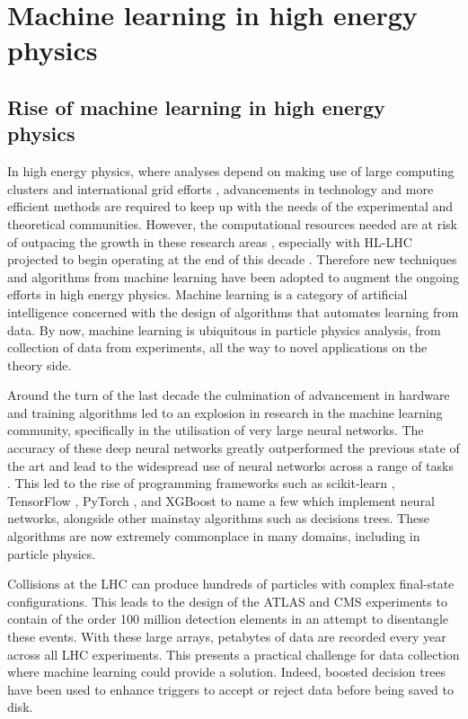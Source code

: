 \documentclass[main.tex]{subfiles}
\begin{document}
\chapter{Machine learning in high energy physics}
\label{chapter:ml}
\section{Rise of machine learning in high energy physics}
    In high energy physics, where analyses
    depend on making use of large computing clusters
    and international grid efforts \cite{WLCG}, advancements
    in technology and more efficient methods are
    required to keep up with the needs of the
    experimental and theoretical communities.
    However, the computational resources needed
    are at risk of outpacing the growth in these research
    areas \cite{Bothmann:2022thx}, especially with
    HL-LHC projected to begin operating at the end
    of this decade \cite{ZurbanoFernandez:2020cco}.
    Therefore new techniques and
    algorithms from machine learning 
    have been adopted to augment the ongoing efforts
    in high energy physics. Machine
    learning is a category of artificial intelligence
    concerned with the design of algorithms that
    automates learning from data.
    By now, machine learning is ubiquitous in
    particle physics analysis, from collection
    of data from experiments, all the way to novel
    applications on the theory side.

    Around the turn of the last decade the culmination
    of advancement in hardware and training algorithms
    led to an explosion in research in the
    machine learning community, specifically in the
    utilisation of very large neural networks. The accuracy
    of these deep neural networks greatly outperformed the
    previous state of the art \cite{NIPS2012_c399862d,russakovsky2015imagenet} and
    lead to the widespread use of neural networks across
    a range of tasks \cite{Schmidhuber_2015}.
    This led to the rise of programming
    frameworks such as scikit-learn \cite{scikit-learn},
    TensorFlow \cite{tensorflow2015-whitepaper},
    PyTorch \cite{paszke2019pytorch},
    and XGBoost \cite{Chen:2016:XST:2939672.2939785}
    to name a few which implement neural networks, alongside
    other mainstay algorithms such as decisions trees.
    These algorithms are now extremely commonplace
    in many domains, including in particle physics. 

    Collisions at the LHC can produce hundreds of
    particles with complex final-state configurations.
    This leads to the design of the ATLAS and CMS experiments
    to contain of the order 100 million detection elements
    in an attempt to disentangle these events. With these large
    arrays, petabytes of data are recorded every year
    across all LHC experiments.
    This presents a practical challenge for data
    collection where machine learning could provide a solution.
    Indeed, boosted decision trees have been used
    to enhance triggers \cite{CMS:2020cmk} to accept or
    reject data before being saved to disk.
\end{document}
